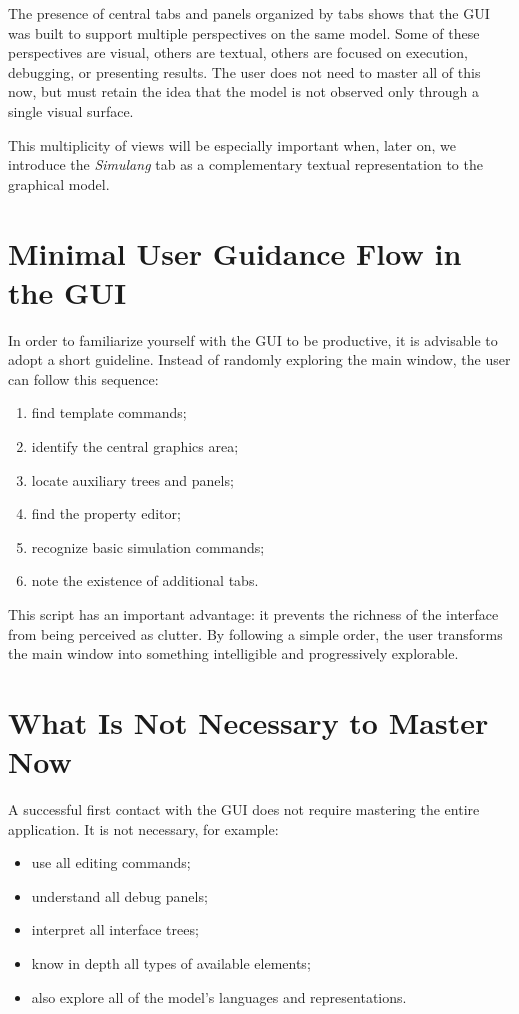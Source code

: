 The presence of central tabs and panels organized by tabs shows that the GUI was built to support multiple perspectives on the same model. Some of these perspectives are visual, others are textual, others are focused on execution, debugging, or presenting results. The user does not need to master all of this now, but must retain the idea that the model is not observed only through a single visual surface.

This multiplicity of views will be especially important when, later on, we introduce the \textit{Simulang} tab as a complementary textual representation to the graphical model.

\section{Minimal User Guidance Flow in the GUI}
\label{sec:cap3_fluxo_minimo_orientacao}

In order to familiarize yourself with the GUI to be productive, it is advisable to adopt a short guideline. Instead of randomly exploring the main window, the user can follow this sequence:

\begin{enumerate}
\item find template commands;
\item identify the central graphics area;
\item locate auxiliary trees and panels;
\item find the property editor;
\item recognize basic simulation commands;
\item note the existence of additional tabs.
\end{enumerate}

This script has an important advantage: it prevents the richness of the interface from being perceived as clutter. By following a simple order, the user transforms the main window into something intelligible and progressively explorable.

\section{What Is Not Necessary to Master Now}
\label{sec:cap3_o_que_nao_dominar_agora}

A successful first contact with the GUI does not require mastering the entire application. It is not necessary, for example:
\begin{itemize}
\item use all editing commands;
\item understand all debug panels;
\item interpret all interface trees;
\item know in depth all types of available elements;
\item also explore all of the model's languages and representations.
\end{itemize}

